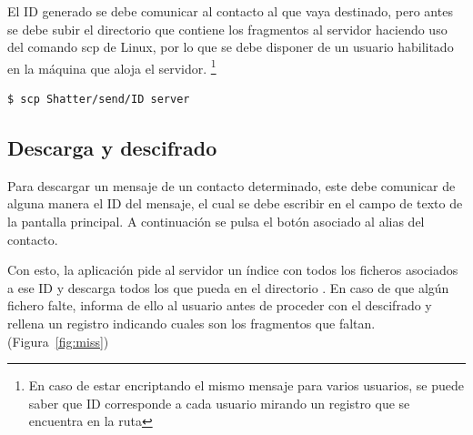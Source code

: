 El ID generado se debe comunicar al contacto al que vaya destinado, pero antes se debe subir el directorio que contiene los fragmentos al servidor haciendo uso del comando scp de Linux, por lo que se debe disponer de un usuario habilitado en la máquina que aloja el servidor. \footnote{En caso de estar encriptando el mismo mensaje para varios usuarios, se puede saber que ID corresponde a cada usuario mirando un registro que se encuentra en la ruta }

\lstset{basicstyle=\ttfamily}
\begin{lstlisting}[language=bash]
  $ scp Shatter/send/ID server
\end{lstlisting}

\subsection{Descarga y descifrado}

Para descargar un mensaje de un contacto determinado, este debe comunicar de alguna manera el ID del mensaje, el cual se debe escribir en el campo de texto de la pantalla principal. A continuación se pulsa el botón  asociado al alias del contacto.

Con esto, la aplicación pide al servidor un índice con todos los ficheros asociados a ese ID y descarga todos los que pueda en el directorio . En caso de que algún fichero falte, informa de ello al usuario antes de proceder con el descifrado y rellena un registro indicando cuales son los fragmentos que faltan. (Figura~\ref{fig:miss})


